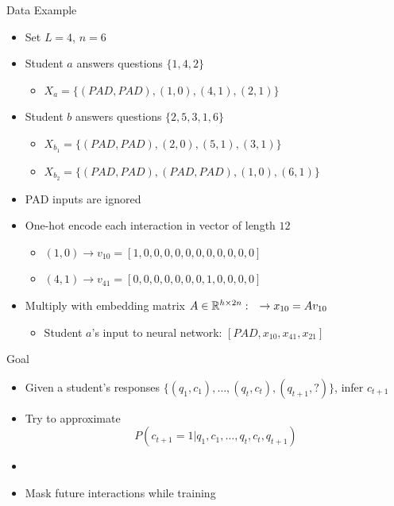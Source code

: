 \documentclass{beamer}
\def \R{\ensuremath \mathbb{R}}
\theoremstyle{definition}
\begin{document}
\begin{frame}{Data Example}
\begin{itemize}
  \item Set $L = 4$, $n=6$
  \item Student $a$ answers questions $\{1,4,2\}$
    \begin{itemize}
      \item $X_a = \{(PAD, PAD), (1,0), (4,1), (2,1)\}$
    \end{itemize}
  \item Student $b$ answers questions $\{2,5,3,1,6\}$
    \begin{itemize}
      \item $X_{b_1} = \{(PAD, PAD), (2,0), (5,1), (3,1)\}$
      \item $X_{b_2} = \{(PAD, PAD), (PAD, PAD), (1,0), (6,1)\}$
    \end{itemize}
  \item PAD inputs are ignored
  \item One-hot encode each interaction in vector of length $12$
    \begin{itemize}
      \item $(1,0) \rightarrow v_{10} = [1,0,0,0,0,0,0,0,0,0,0,0]$
      \item $(4,1) \rightarrow v_{41} = [0,0,0,0,0,0,0,1,0,0,0,0]$
    \end{itemize}
  \item Multiply with embedding matrix $A \in \R^{h \times 2n}: \quad \rightarrow x_{10} = Av_{10}$
    \begin{itemize}
      \item Student $a$'s input to neural network: $[PAD, x_{10}, x_{41}, x_{21}]$
    \end{itemize}
\end{itemize}
\end{frame}

\begin{frame}{Goal}
  \begin{itemize}
    \item Given a student's responses $\{(q_1, c_1), \ldots ,(q_t, c_t), (q_{t+1}, ?)\}$, infer $c_{t+1}$ 
    \item Try to approximate \[P(c_{t+1} = 1 | q_1,c_1, \ldots ,q_t, c_t, q_{t+1})\]
    \item[] 
    \item Mask future interactions while training
  \end{itemize}
\end{frame}
\end{document}
